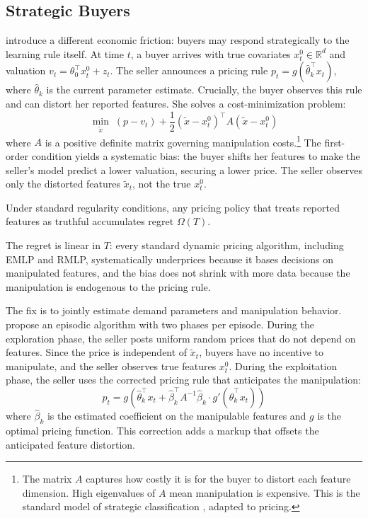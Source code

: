 \subsection{Strategic Buyers}
\label{sec:liu}

\citet{Liu2024strategic} introduce a different economic friction: buyers may respond strategically to the learning rule itself. At time $t$, a buyer arrives with true covariates $x_t^0 \in \mathbb{R}^d$ and valuation $v_t = \theta_0^\top x_t^0 + z_t$. The seller announces a pricing rule $p_t = g(\hat{\theta}_k^\top x_t)$, where $\hat{\theta}_k$ is the current parameter estimate. Crucially, the buyer observes this rule and can distort her reported features. She solves a cost-minimization problem:
\begin{equation}
\label{eq:manipulation}
\min_{\tilde{x}} \; (p - v_t) + \frac{1}{2}(\tilde{x} - x_t^0)^\top A (\tilde{x} - x_t^0)
\end{equation}
where $A$ is a positive definite matrix governing manipulation costs.\footnote{The matrix $A$ captures how costly it is for the buyer to distort each feature dimension. High eigenvalues of $A$ mean manipulation is expensive. This is the standard model of strategic classification \citep{Hardt2016}, adapted to pricing.} The first-order condition yields a systematic bias: the buyer shifts her features to make the seller's model predict a lower valuation, securing a lower price. The seller observes only the distorted features $\tilde{x}_t$, not the true $x_t^0$.

\begin{theorem}
\label{thm:liu_impossibility}
Under standard regularity conditions, any pricing policy that treats reported features as truthful accumulates regret $\Omega(T)$.
\end{theorem}

The regret is linear in $T$: every standard dynamic pricing algorithm, including EMLP and RMLP, systematically underprices because it bases decisions on manipulated features, and the bias does not shrink with more data because the manipulation is endogenous to the pricing rule.

The fix is to jointly estimate demand parameters and manipulation behavior. \citet{Liu2024strategic} propose an episodic algorithm with two phases per episode. During the exploration phase, the seller posts uniform random prices that do not depend on features. Since the price is independent of $\tilde{x}_t$, buyers have no incentive to manipulate, and the seller observes true features $x_t^0$. During the exploitation phase, the seller uses the corrected pricing rule that anticipates the manipulation:
\begin{equation}
\label{eq:strategic_price}
p_t = g\left(\hat{\theta}_k^\top x_t + \hat{\beta}_k^\top A^{-1} \hat{\beta}_k \cdot g'(\hat{\theta}_k^\top x_t)\right)
\end{equation}
where $\hat{\beta}_k$ is the estimated coefficient on the manipulable features and $g$ is the optimal pricing function. This correction adds a markup that offsets the anticipated feature distortion.

